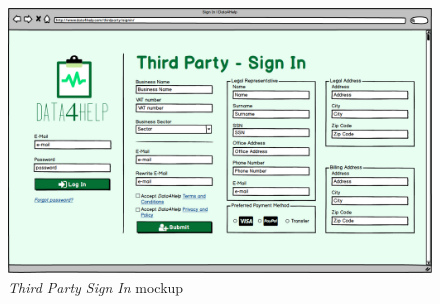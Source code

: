 \begin{figure}[H]
\begin{center}
  \includegraphics[width=\textwidth]{img/mockup/ThirdParty_SingIn.png}
  \hspace{0.05\linewidth}
  \centering
  \caption{\textit{Third Party Sign In} mockup}
  \label{img:thirdPartySignInMockup}
\end{center}
\end{figure}

